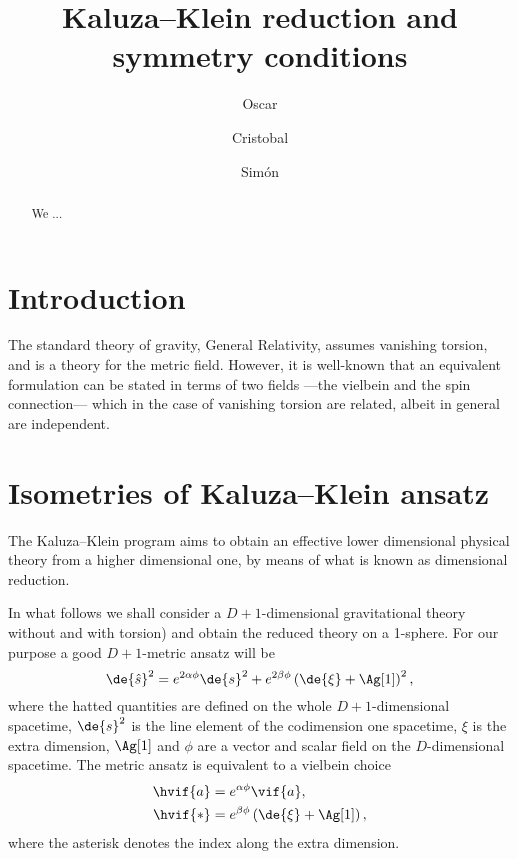 \documentclass[aps,prd,12pt,superscriptaddress,showpacs,showkeys,reprint]{revtex4-1}
\begin{document}
\title{Kaluza--Klein reduction and symmetry conditions}

\author{Oscar }

\author{Cristobal }

\author{Sim\'on }

\begin{abstract}
  We ...
\end{abstract}



\maketitle

\section{\label{intro}Introduction}

The standard theory of gravity, General Relativity, assumes vanishing torsion, and is a theory for the metric field. However, it is well-known that an equivalent formulation can be stated in terms of two fields ---the vielbein and the spin connection--- which in the case of vanishing torsion are related, albeit in general are independent.

\section{Isometries of Kaluza--Klein ansatz}

The Kaluza--Klein program aims to obtain an effective lower dimensional physical theory from a higher dimensional one, by means of what is known as dimensional reduction.

In what follows we shall consider a $D+1$-dimensional gravitational theory without and with torsion) and obtain the reduced theory on a 1-sphere. For our purpose a good $D+1$-metric ansatz will be~\cite{Duff:1986hr,PopeKK}
\begin{equation}
  \de{\hat{s}}^2 = e^{2\alpha\phi} \de{s}^2 + e^{2 \beta \phi} \left( \de{\xi} + \Ag[1] \right)^2,
  \label{KKansatz}
\end{equation}
where the hatted quantities are defined on the whole $D+1$-dimensional spacetime, $\de{s}^2$ is the line element of the codimension one spacetime, $\xi$ is the extra dimension, $\Ag[1]$ and $\phi$ are a vector and scalar field on the $D$-dimensional spacetime. The metric ansatz is equivalent to a vielbein choice
\begin{equation}
  \begin{split}
    \hvif{a} &= e^{\alpha \phi} \vif{a}, \\
    \hvif{*} &= e^{\beta \phi} \left( \de{\xi} + \Ag[1] \right),
  \end{split}
\end{equation}
where the asterisk denotes the index along the extra dimension.
\end{document}
